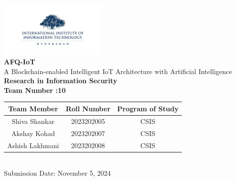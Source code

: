 \documentclass[12pt, oneside]{report}
\begin{document}
\begin{titlepage}
    \centering
    \vspace*{1cm} %
    
    \includegraphics[width=0.4\textwidth]{img.jpg} \\[1cm] %
    
    {\Huge\textbf{AFQ-IoT}}\\[0.5cm]
    {\Large A Blockchain-enabled Intelligent IoT Architecture with Artificial Intelligence}\\[1cm]
    
    {\Large\textbf{Research in Information Security}}\\[0.3cm]

    
    {\Large\textbf{Team Number :10}}\\[0.5cm]
    \begin{tabular}{|c|c|c|}
    \hline
    \textbf{Team Member} & \textbf{Roll Number} & \textbf{Program of Study} \\
    \hline
    Shiva Shankar & 2023202005 & CSIS \\
    Akshay Kohad & 2023202007 & CSIS \\
    Ashish Lakhmani & 2023202008 & CSIS \\

    \hline
    \end{tabular}\\[1cm]
    
    {\Large Submission Date: November 5, 2024}
    
    \vfill %
    
\end{titlepage}

\end{document}
